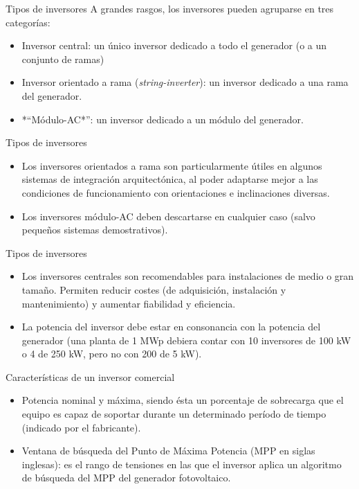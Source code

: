 \documentclass[xcolor={usenames,svgnames,dvipsnames}]{beamer}
\begin{document}
\begin{frame}[label=sec-2-0-3]{Tipos de inversores}
A grandes rasgos, los inversores pueden agruparse en tres categorías:

\begin{itemize}
\item \alert{Inversor central}: un único inversor dedicado a todo el generador (o
a un conjunto de ramas)

\item \alert{Inversor orientado a rama} (\emph{string-inverter}): un inversor dedicado
a una rama del generador.

\item *``Módulo-AC*”: un inversor dedicado a un módulo del generador.
\end{itemize}
\end{frame}

\begin{frame}[label=sec-2-0-4]{Tipos de inversores}
\begin{itemize}
\item Los \alert{inversores orientados a rama} son particularmente útiles en
algunos sistemas de integración arquitectónica, al poder adaptarse
mejor a las condiciones de funcionamiento con orientaciones e
inclinaciones diversas.

\item Los inversores \alert{módulo-AC} deben descartarse en cualquier caso (salvo
pequeños sistemas demostrativos).
\end{itemize}
\end{frame}

\begin{frame}[label=sec-2-0-5]{Tipos de inversores}
\begin{itemize}
\item Los \alert{inversores centrales} son recomendables para instalaciones de
medio o gran tamaño. Permiten reducir costes (de adquisición,
instalación y mantenimiento) y aumentar fiabilidad y eficiencia.

\item \alert{La potencia del inversor debe estar en consonancia con la potencia
del generador} (una planta de 1 MWp debiera contar con 10 inversores
de 100 kW o 4 de 250 kW, pero no con 200 de 5 kW).
\end{itemize}
\end{frame}

\begin{frame}[label=sec-2-0-6]{Características de un inversor comercial}
\begin{itemize}
\item \alert{Potencia nominal y máxima}, siendo ésta un porcentaje de sobrecarga
que el equipo es capaz de soportar durante un determinado período de
tiempo (indicado por el fabricante).

\item \alert{Ventana de búsqueda del Punto de Máxima Potencia} (MPP en siglas
inglesas): es el rango de tensiones en las que el inversor aplica un
algoritmo de búsqueda del MPP del generador fotovoltaico.
\end{itemize}
\end{frame}
\end{document}

